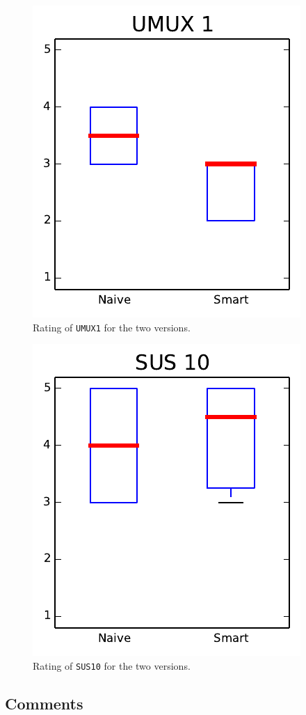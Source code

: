 \begin{figure}
\center
\includegraphics[width=.9\textwidth]{img/graphs/4a_01.pdf}
\caption{Rating of \texttt{UMUX1} for the two versions.}
\end{figure}

\begin{figure}
\center
\includegraphics[width=.9\textwidth]{img/graphs/4a_09.pdf}
\caption{Rating of \texttt{SUS10} for the two versions.}
\end{figure}

\subsection{Comments}
\nlipsum
